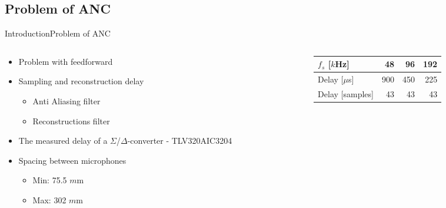\subsection{Problem of ANC}
\begin{frame}{Introduction}{Problem of ANC}		
	\begin{columns}
		\begin{column}{0.5\textwidth}
		\begin{itemize}
		\item Problem with feedforward
		\item Sampling and reconstruction delay
		\begin{itemize}
			\item Anti Aliasing filter
			\item Reconstructions filter
		\end{itemize}
		\item The measured delay of a $\Sigma$/$\Delta$-converter - TLV320AIC3204
		\item Spacing between microphones
		\begin{itemize}
			\item Min: 75.5 $m$m
			\item Max: 302 $m$m
		\end{itemize}
		\end{itemize}
		\end{column}
		\begin{column}{0.5\textwidth} 
		\begin{table}[H]
			\centering
			\begin{tabular}{|l|r|r|r|}
				\hline
				$f_s$ {[}$k$Hz{]} & 48 & 96 & 192 \\ \hline
				Delay {[}$\mu$s{]} & 900 & 450 & 225 \\ \hline
				Delay {[}samples{]} & 43 & 43 & 43 \\ \hline
			\end{tabular}
		\end{table}
		\end{column}
	\end{columns}
\end{frame}






